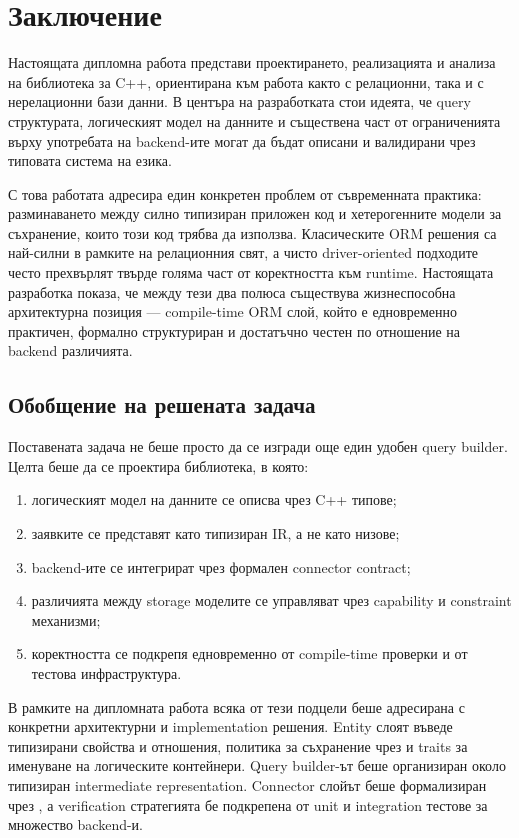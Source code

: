 \section{Заключение}
\label{sec:conclusion}

Настоящата дипломна работа представи проектирането, реализацията и анализа на \ORMName{} библиотека за C++, ориентирана към работа както с релационни, така и с нерелационни бази данни. В центъра на разработката стои идеята, че query структурата, логическият модел на данните и съществена част от ограниченията върху употребата на backend-ите могат да бъдат описани и валидирани чрез типовата система на езика.

С това работата адресира един конкретен проблем от съвременната практика: разминаването между силно типизиран приложен код и хетерогенните модели за съхранение, които този код трябва да използва. Класическите ORM решения са най-силни в рамките на релационния свят, а чисто driver-oriented подходите често прехвърлят твърде голяма част от коректността към runtime. Настоящата разработка показа, че между тези два полюса съществува жизнеспособна архитектурна позиция --- compile-time ORM слой, който е едновременно практичен, формално структуриран и достатъчно честен по отношение на backend различията.

\subsection{Обобщение на решената задача}

Поставената задача не беше просто да се изгради още един удобен query builder. Целта беше да се проектира библиотека, в която:

\begin{enumerate}[label=\arabic*.]
    \item логическият модел на данните се описва чрез C++ типове;
    \item заявките се представят като типизиран IR, а не като низове;
    \item backend-ите се интегрират чрез формален connector contract;
    \item различията между storage моделите се управляват чрез capability и constraint механизми;
    \item коректността се подкрепя едновременно от compile-time проверки и от тестова инфраструктура.
\end{enumerate}

В рамките на дипломната работа всяка от тези подцели беше адресирана с конкретни архитектурни и implementation решения. Entity слоят въведе типизирани свойства и отношения, политика за съхранение чрез  и traits за именуване на логическите контейнери. Query builder-ът беше организиран около типизиран intermediate representation. Connector слойът беше формализиран чрез , а verification стратегията бе подкрепена от unit и integration тестове за множество backend-и.

